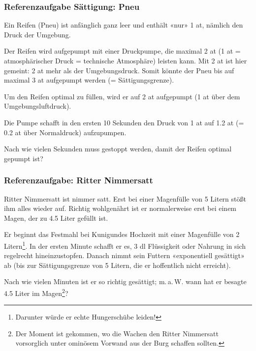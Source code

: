 \subsubsection{Referenzaufgabe Sättigung: Pneu}

Ein Reifen (Pneu) ist anfänglich ganz leer und enthält «nur» 1 at, nämlich den
Druck der Umgebung. 

Der Reifen wird aufgepumpt mit einer Druckpumpe, die maximal 2 at
(1 at = atmosphärischer Druck = technische Atmosphäre) leisten
kann. Mit 2 at ist hier gemeint: 2 at mehr als der
Umgebungsdruck. Somit könnte der Pneu bis auf maximal 3 at aufgepumpt
werden (= Sättigungsgrenze).

Um den Reifen optimal zu füllen, wird er auf 2 at aufgepumpt (1 at
über dem Umgebungsluftdruck).

Die Pumpe schafft in den ersten 10 Sekunden den Druck von 1 at auf 1.2
at (= 0.2 at über Normaldruck) aufzupumpen.

Nach wie vielen Sekunden muss gestoppt werden, damit der Reifen
optimal gepumpt ist?

\newpage

\subsubsection{Referenzaufgabe: Ritter
  Nimmersatt}
Ritter Nimmersatt ist nimmer satt. Erst bei einer Magenfülle von
5 Litern stößt ihm alles wieder auf. Richtig wohlgenährt ist er
normalerweise erst bei einem Magen, der zu 4.5 Liter gefüllt ist.

Er beginnt das Festmahl bei Kunigundes Hochzeit mit einer Magenfülle
von 2 Litern\footnote{Darunter würde er echte Hungerschübe
  leiden!}. In der ersten Minute schafft er es, 3 dl Flüssigkeit oder Nahrung
in sich regelrecht hineinzustopfen. Danach nimmt sein Futtern
«exponentiell gesättigt» ab (bis zur Sättigungsgrenze von 5 Litern, die er
hoffentlich nicht erreicht).

Nach wie vielen Minuten ist er so richtig gesättigt; m.\,a.\,W. wann
hat er besagte 4.5 Liter im Magen\footnote{Der Moment ist gekommen, wo
  die Wachen den Ritter Nimmersatt vorsorglich unter ominösem Vorwand aus der Burg schaffen sollten.}?

